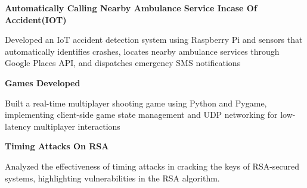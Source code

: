\begin{cventries}
  \cventry
    { \textbf{ Automatically Calling Nearby Ambulance Service Incase Of Accident(IOT) } }{}{}{}
    {
      \begin{cvitems}
        Developed an IoT accident detection system using Raspberry Pi and sensors that automatically identifies crashes, locates nearby ambulance services through Google Places API, and dispatches emergency SMS notifications
      \end{cvitems}
    }
  \cventry
    { \textbf{Games Developed} }{}{}{}
    {
      \begin{cvitems}
        {Built a real-time multiplayer shooting game using Python and Pygame, implementing client-side game state management and UDP networking for low-latency multiplayer interactions}
      \end{cvitems}
    }
  \cventry  
    {\textbf{Timing Attacks On RSA}}{}{}{}
    {
      \begin{cvitems}
        {Analyzed the effectiveness of timing attacks in cracking the keys of RSA-secured systems, highlighting vulnerabilities in the RSA algorithm.}
      \end{cvitems}
    }
  
\end{cventries}